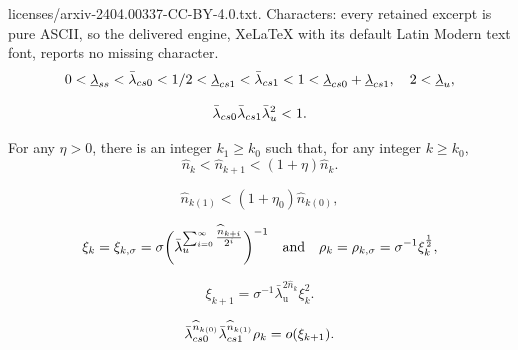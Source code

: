 \documentclass[10pt,a4paper]{amsart}
\begin{document}
licenses/arxiv-2404.00337-CC-BY-4.0.txt. Characters: every retained excerpt is pure ASCII, so the delivered engine, XeLaTeX with its default Latin Modern text font, reports no missing character.
\begin{equation}\label{eqn_eigen_v2}
0<\underline{\lambda}_{\rm ss}<\bar\lambda_{\rm cs0}<1/2<\underline\lambda_{\rm cs1}<\bar\lambda_{\rm cs1}<1<\underline\lambda_{\rm cs0}+\underline\lambda_{\rm cs1},\quad 2<\underline\lambda_{\rm u},
\end{equation}

\begin{equation}\label{pdc2}
\bar\lambda_{\rm cs0}\bar\lambda_{\rm cs1}\bar\lambda_{u}^{2}<1.
\end{equation}

\begin{lem}\label{subexp}
For any $\eta>0$, there is an integer $k_{1}\geq k_0$ such that, for any integer $k\geq k_{0}$, 
\[
\widehat n_{k}<\widehat n_{k+1}<(1+\eta) \widehat n_{k}. %
\]
\end{lem}

\begin{equation}\label{eqn_majority_nk}
\widehat n_{k(1)}<(1+\eta_0)\widehat n_{k(0)}, 
\end{equation}

\begin{equation}\label{eqn_xi_zeta}
\xi_{k}\index{xik@$\xi_k$}=\xi_{k,\sigma}=\sigma\biggl(\bar{\lambda}_{\rm u}^{\sum_{i=0}^{\infty} \tfrac{\widehat n_{k+i}}{2^{i}}} \biggr)^{-1}
\quad\text{and}\quad
\rho_{k}\index{rhok@$\rho_k$}=\rho_{k,\sigma}=\sigma^{-1}\xi_k^{\frac12},
\end{equation}

\begin{equation}\label{eqn_xi_al_xi}
\xi_{k+1}=\sigma^{-1}\bar\lambda_{\mathrm{u}}^{2\widehat n_k}\xi_k^2.
\end{equation}

\begin{lem}\label{lem7.3}
$$
\bar\lambda_{\rm cs0}^{\widehat n_{k(0)}}\bar\lambda_{\rm cs1}^{\widehat n_{k(1)}}\rho_{k}=o(\xi_{k+1}).
$$
\end{lem}
\end{document}
